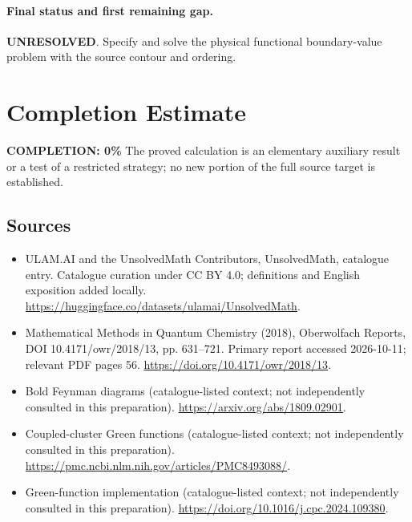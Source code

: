 \documentclass[11pt]{article}
\begin{document}
\paragraph{Final status and first remaining gap.}
\textbf{UNRESOLVED}. Specify and solve the physical functional boundary-value problem with the source contour and ordering.

\section{Completion Estimate}
\noindent\textbf{COMPLETION: 0\%}
The proved calculation is an elementary auxiliary result or a test of a restricted strategy; no new portion of the full source target is established.

\subsection{Sources}
\begin{itemize}
\item[\hypertarget{source:statement:1}{S1}] ULAM.AI and the UnsolvedMath Contributors, UnsolvedMath, catalogue entry. Catalogue curation under CC BY 4.0; definitions and English exposition added locally.
\url{https://huggingface.co/datasets/ulamai/UnsolvedMath}.
\item[\hypertarget{source:statement:2}{S2}] Mathematical Methods in Quantum Chemistry (2018), Oberwolfach Reports, DOI 10.4171/owr/2018/13, pp. 631--721. Primary report accessed 2026-10-11; relevant PDF pages 56.
\url{https://doi.org/10.4171/owr/2018/13}.
\item[\hypertarget{source:statement:3}{S3}] Bold Feynman diagrams (catalogue-listed context; not independently consulted in this preparation).
\url{https://arxiv.org/abs/1809.02901}.
\item[\hypertarget{source:statement:4}{S4}] Coupled-cluster Green functions (catalogue-listed context; not independently consulted in this preparation).
\url{https://pmc.ncbi.nlm.nih.gov/articles/PMC8493088/}.
\item[\hypertarget{source:statement:5}{S5}] Green-function implementation (catalogue-listed context; not independently consulted in this preparation).
\url{https://doi.org/10.1016/j.cpc.2024.109380}.
\end{itemize}
\label{end:statement}
\end{document}
